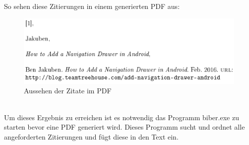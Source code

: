 \documentclass[FIPLY_base.tex]{subfiles}
\begin{document}
\ \\

\ \\
So sehen diese Zitierungen in einem generierten PDF aus:
\begin{figure}[H]
	\includegraphics[scale=0.5]{img/Citations}
	\caption{Aussehen der Zitate im PDF}
\end{figure}
\ \\
Um dieses Ergebnis zu erreichen ist es notwendig das Programm biber.exe zu starten bevor eine PDF generiert wird.
Dieses Programm sucht und ordnet alle angeforderten Zitierungen und fügt diese in den Text ein.


%
%
%
\end{document}
